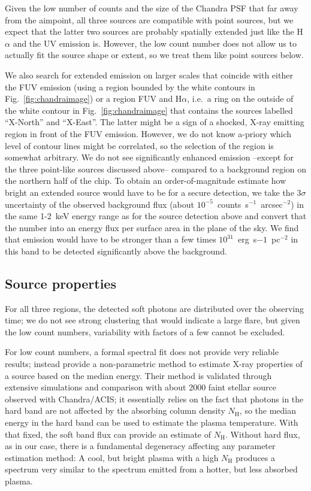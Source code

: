 \documentclass[linenumbers]{aastex631}
\begin{document}
Given the low number of counts and the size of the Chandra PSF that far away from the aimpoint, all three sources are compatible with point sources, but we expect that the latter two sources are probably spatially extended just like the H$\alpha$ and the UV emission is. However, the low count number does not allow us to actually fit the source shape or extent, so we treat them like point sources below. 

We also search for extended emission on larger scales that coincide with either the FUV emission (using a region bounded by the white contours  in Fig.~\ref{fig:chandraimage}) or a region FUV and H$\alpha$, i.e.\ a ring on the outside of the white contour in Fig.~\ref{fig:chandraimage} that contains the sources labelled ``X-North'' and ``X-East''. The latter might be a sign of a shocked, X-ray emitting region in front of the FUV emission. However, we do not know a-priory which level of contour lines might be correlated, so the selection of the region is somewhat arbitrary. We do not see significantly enhanced emission --except for the three point-like sources discussed above-- compared to a background region on the northern half of the chip. To obtain an order-of-magnitude estimate how bright an extended source would have to be for a secure detection, we take the $3\sigma$ uncertainty of the observed background flux (about $10^{-5}$~counts~s$^{-1}$~arcsec$^{-2}$) in the same 1-2~keV energy range as for the source detection above and convert that the number into an energy flux per surface area in the plane of the sky. We find that emission would have to be stronger than a few times $10^{31}$~erg~s${-1}$~pc$^{-2}$ in this band to be detected significantly above the background.

\subsection{Source properties}
For all three regions, the detected soft photons are distributed over the observing time; we do not see strong clustering that would indicate a large flare, but given the low count numbers, variability with factors of a few cannot be excluded.

For low count numbers, a formal spectral fit does not provide very reliable results; \citet{2010ApJ...708.1760G} instead provide a non-parametric method to estimate X-ray properties of a source based on the median energy. Their method is validated through extensive simulations and comparison with about 2000 faint stellar source observed with Chandra/ACIS; it essentially relies on the fact that photons in the hard band are not affected by the absorbing column density $N_\mathrm{H}$, so the median energy in the hard band can be used to estimate the plasma temperature. With that fixed, the soft band flux can provide an estimate of $N_\mathrm{H}$. Without hard flux, as in our case, there is a fundamental degeneracy affecting any parameter estimation method: A cool, but bright plasma with a high $N_\mathrm{H}$ produces a spectrum very similar to the spectrum emitted from a hotter, but less absorbed plasma.
\end{document}
